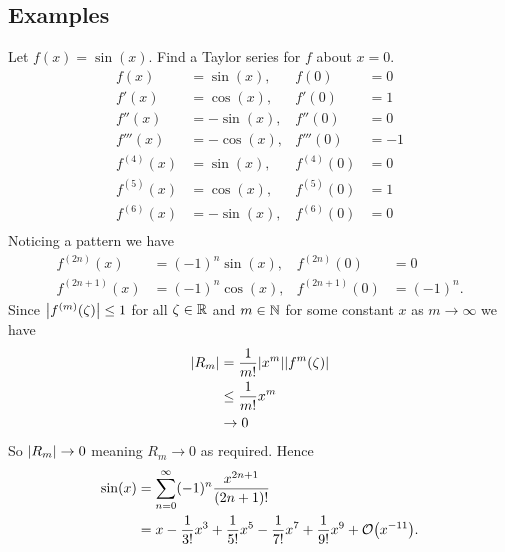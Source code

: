 \documentclass[a4paper]{article}
\begin{document}
    \subsection{Examples}
    Let \(f(x) = \sin(x)\).
    Find a Taylor series for \(f\) about \(x = 0\).
    \begin{align*}
        f(x) &= \sin(x), & f(0) &= 0\\
        f'(x) &= \cos(x), & f'(0) &= 1\\
        f''(x) &= -\sin(x), & f''(0) &= 0\\
        f'''(x) &= -\cos(x), & f'''(0) &= -1\\
        f^{(4)}(x) &= \sin(x), & f^{(4)}(0) &= 0\\
        f^{(5)}(x) &= \cos(x), & f^{(5)}(0) &= 1\\
        f^{(6)}(x) &= -\sin(x), & f^{(6)}(0) &= 0\\
    \end{align*}
    Noticing a pattern we have
    \begin{align*}
        f^{(2n)}(x) &= (-1)^n\sin(x), & f^{(2n)}(0) &= 0\\
        f^{(2n+1)}(x) &= (-1)^n\cos(x), & f^{(2n+1)}(0) &= (-1)^n.
    \end{align*}
    Since \(\abs{f^{(m)}(\zeta)}\le 1\) for all \(\zeta\in\mathbb{R}\) and \(m\in\mathbb{N}\) for some constant \(x\) as \(m\to\infty\) we have
    \begin{align*}
        \abs{R_m} &= \frac{1}{m!}\abs{x^m}\abs{f^{m}(\zeta)}\\
        &\le \frac{1}{m!}x^m\\
        &\to 0
    \end{align*}
    So \(\abs{R_m}\to 0\) meaning \(R_m\to 0\) as required.
    Hence
    \begin{align*}
        \sin(x) &= \sum_{n=0}^{\infty}(-1)^n\frac{x^{2n+1}}{(2n+1)!}\\
        &= x - \frac{1}{3!}x^3 + \frac{1}{5!}x^5 - \frac{1}{7!}x^7 + \frac{1}{9!}x^9 + \order{x^{-11}}.
    \end{align*}
    
\end{document}
